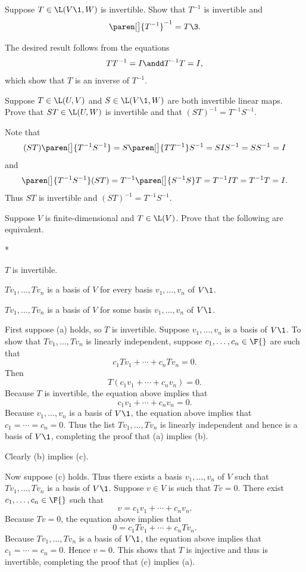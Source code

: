 
\exercise
Suppose $T \in \L(V\1, W)$ is invertible. Show that $T^{-1}$ is invertible and
\[
\paren[\big]{ T^{-1} }^{-1} = T\3.
\]
\exercisedisplayend

\begin{Solution}
The desired result follows from the equations
\[
TT^{-1} = I \andd T^{-1}T = I,
\]
which show that $T$ is an inverse of $T^{-1}$.
\end{Solution}

\exercise
Suppose $T \in \L(U, V)$ and $S \in \L(V\1,W)$ are both invertible linear maps. Prove that $ST \in \L(U, W)$ is invertible and that $(ST)^{-1} = T^{-1} S^{-1}\!$.

\begin{Solution}
Note that
\[
(ST)\paren[\big]{T^{-1} S^{-1}} = S\paren[\big]{ T T^{-1}} S^{-1} = S I S^{-1} = S S^{-1} = I
\]
and
\[
\paren[\big]{T^{-1} S^{-1}}(ST) = T^{-1} \paren[\big]{S^{-1} S}T = T^{-1} I T = T^{-1} T = I.
\]
Thus $ST$ is invertible and $(ST)^{-1} = T^{-1} S^{-1}$.
\end{Solution}

\exercise
Suppose $V$ is finite-dimensional and $T \in \L(V)$. Prove that the following are equivalent.
\begin{subtheorem}*
\item
$T$ is invertible.
\item
$Tv_1, \ldots, Tv_n$ is a basis of $V$ for every basis $v_1, \ldots, v_n$ of $V\1$.
\item
$Tv_1, \ldots, Tv_n$ is a basis of $V$ for some basis $v_1, \ldots, v_n$ of $V\1$.
\end{subtheorem}
\exercisesubtheoremend

\begin{Solution}
First suppose (a) holds, so $T$ is invertible. Suppose $v_1, \ldots, v_n$ is a basis of $V\1$. To show that $Tv_1, \ldots, Tv_n$ is linearly independent, suppose $c_1, \ldots, c_n \in \F{}$ are such that
\[
c_1 Tv_1 + \cdots + c_n Tv_n = 0.
\]
Then
\[
T(c_1 v_1 + \cdots + c_n v_n) = 0.
\]
Because $T$ is invertible, the equation above implies that
\[
c_1  v_1 +  \cdots + c_n v_n = 0.
\]
Because $v_1, \ldots, v_n$ is a basis of $V\1$, the equation above implies that $c_1 = \cdots = c_n = 0$. Thus the list
$Tv_1, \ldots, Tv_n$ is linearly independent and hence is a basis of $V\1$, completing the proof that (a) implies (b).

Clearly (b) implies (c).

Now suppose (c) holds. Thus there exists a basis $v_1, \ldots, v_n$ of $V$ such that $Tv_1, \ldots, Tv_n$ is a basis of $V\1$. Suppose $v \in V$ is such that $Tv = 0$. There exist $c_1, \ldots, c_n \in \F{}$ such that
\[
v = c_1v_1 +  \cdots + c_n v_n.
\]
Because $Tv = 0$, the equation above implies that
\[
0 = c_1 Tv_1 + \cdots + c_n Tv_n.
\]
Because $Tv_1, \ldots, Tv_n$ is a basis of $V\1$, the equation above implies that $c_1 = \cdots = c_n = 0$. Hence $v = 0$. This shows that $T$ is injective and thus is invertible, completing the proof that (c) implies (a).
\end{Solution}

